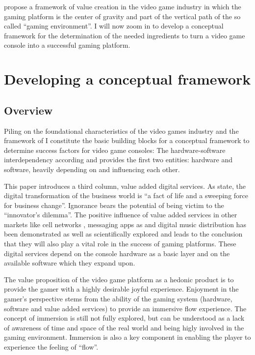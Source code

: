 \documentclass
[
    a4paper,
    11pt
]
{article}
\begin{document}
\cite{Hennig-Thurau2013} propose a framework of value creation in the
video game industry in which the gaming platform is the center of
gravity and part of the vertical path of the so called ``gaming
environment''. I will now zoom in to develop a conceptual framework for
the determination of the needed ingredients to turn a video game console
into a successful gaming platform.
%
\section{Developing a conceptual framework}
\label{developing-a-conceptual-framework}
%
\subsection{Overview}
\label{overview}
%
Piling on the foundational characteristics of the video games industry
and the framework of \cite{Hennig-Thurau2013} I constitute the basic
building blocks for a conceptual framework to determine success factors
for video game consoles: The hardware-software interdependency according
\cite{KatzMichaelL.1994} and \cite{Clements2005} provides the first two
entities: hardware and software, heavily depending on and influencing
each other.

This paper introduces a third column, value added digital services. As
\cite{CapGemini2015} state, the digital transformation of the business
world is ``a fact of life and a sweeping force for business change''.
Ignorance bears the potential of being victim to the ``innovator's
dilemma''. \cite{christensen2003innovator} The positive influence of
value added services in other markets like cell networks \cite{Kuo2009},
messaging apps as \cite{Line} and digital music distribution
\cite{Bockstedt2006} has been demonstrated as well as scientifically
explored and leads to the conclusion that they will also play a vital
role in the success of gaming platforms. These digital services depend
on the console hardware as a basic layer and on the available software
which they expand upon.

The value proposition of the video game platform as a hedonic product is
to provide the gamer with a highly desirable joyful experience.
Enjoyment in the gamer's perspective stems from the ability of the
gaming system (hardware, software and value added services) to provide
an immersive flow experience. The concept of immersion is still not
fully explored, but can be understood as a lack of awareness of time and
space of the real world and being higly involved in the gaming
environment. \cite{Jennett2008} Immersion is also a key component in
enabling the player to experience the feeling of ``flow''.\cite{Sweetser2005}
\end{document}
